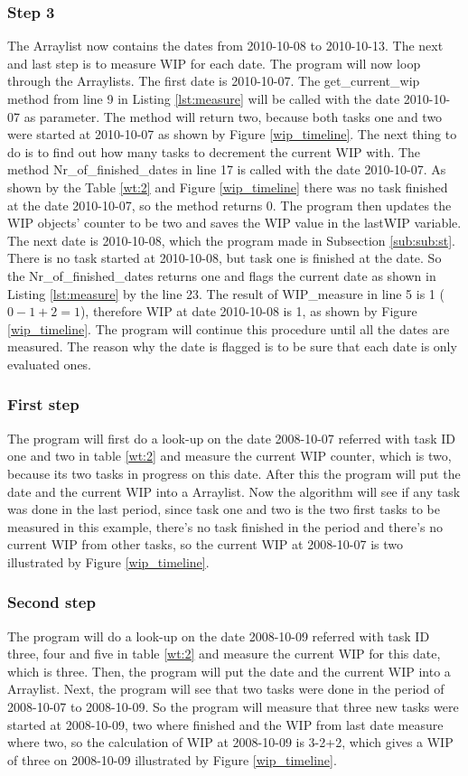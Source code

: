 \documentclass[UKenglish]{ifimaster}  %
\begin{document}
\subsubsection{Step 3}
The Arraylist now contains the dates from 2010-10-08 to 2010-10-13. The next and last step is to measure WIP for each date.  The program will now loop through the Arraylists. The first date is 2010-10-07.  The get\_current\_wip method from line 9 in Listing \ref{lst:measure} will be called with the date 2010-10-07 as parameter.  The method will return two, because both tasks one and two were started at 2010-10-07 as shown by Figure \ref{wip_timeline}. The next thing to do is to find out how many tasks to decrement the current WIP with.  The method Nr\_of\_finished\_dates in line 17 is called with the date 2010-10-07. As shown by the Table \ref{wt:2} and Figure \ref{wip_timeline} there was no task finished at the date 2010-10-07, so the method returns 0. The program then updates the WIP objects' counter to be two and saves the WIP value in the lastWIP variable. The next date is 2010-10-08, which the program made in Subsection \ref{sub:sub:st}. There is no task started at 2010-10-08, but task one is finished at the date. So the Nr\_of\_finished\_dates returns one and flags the current date as shown in Listing \ref{lst:measure} by the line 23. The result of WIP\_measure in line 5 is 1 ($0-1+2=1$), therefore WIP at date 2010-10-08 is 1, as shown by Figure \ref{wip_timeline}. The program will continue this procedure until all the dates are measured.  The reason why the date is flagged is to be sure that each date is only evaluated ones.
\iffalse
\subsubsection{First step}
\label{subsubsec:ft}
The program will first do a look-up on the date 2008-10-07 referred with task ID one and two in table \ref{wt:2} and measure the current WIP counter, which is two, because its two tasks in progress on this date. After this the program will put the date and the current WIP into a Arraylist. 
Now the algorithm will see if any task was done in the last period, since task one and two is the two first tasks to be measured in this example, there's no task finished in the period and there's no current WIP from other tasks, so the current WIP at 2008-10-07 is two illustrated by Figure \ref{wip_timeline}. 
\subsubsection{Second step}
The program will do a look-up on the date 2008-10-09 referred with task ID three, four and five in table \ref{wt:2}  and measure the current WIP for this date, which is three. Then, the program will put the date and the current WIP into a Arraylist.
Next, the program will see that two tasks were done in the period of 2008-10-07 to 2008-10-09. So the program will measure that three new tasks were started at 2008-10-09, two where finished and the WIP from last date measure where two, so the calculation of WIP at 2008-10-09 is 3-2+2, which gives a WIP of three on 2008-10-09 illustrated by Figure \ref{wip_timeline}. 
\end{document}
